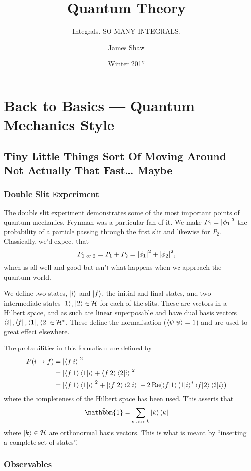 \documentclass[]{scrreprt}
\title{Quantum Theory}
\subtitle{Integrals. SO MANY INTEGRALS.}
\author{James Shaw}
\date{Winter 2017}
\begin{document}


\tableofcontents %

\part{Back to Basics --- Quantum Mechanics Style}
\chapter{Tiny Little Things Sort Of Moving Around Not Actually That Fast\ldots{} Maybe}
\section{Double Slit Experiment}

The double slit experiment demonstrates some of the most important points of quantum mechanics.
Feynman was a particular fan of it. We make $P_1 = \abs{\phi_1}^2$ the probability of a particle passing through the first slit and likewise for $P_2$.
Classically, we'd expect that $$P_{1\text{ or }2} = P_1 + P_2 = \abs{\phi_1}^2 + \abs{\phi_2}^2,$$ which is all well and good but isn't what happens when we approach the quantum world.

We define two states, $\ket{i}$ and $\ket{f}$, the initial and final states, and two intermediate states $\ket{1}, \ket{2} \in \mathcal{H}$ for each of the slits.
These are vectors in a Hilbert space, and as such are linear superposable and have dual basis vectors $\bra{i}, \bra{f}, \bra{1}, \bra{2} \in \mathcal{H}^\ast$.
These define the normalisation ($\braket{\psi} = 1$) and are used to great effect elsewhere.

The probabilities in this formalism are defined by
\begin{align*}
  P(i \to f) &= \abs{\bra{f}\ket{i}}^2\\
   &= \abs{\bra{f}\ket{1}\bra{1}\ket{i} + \bra{f}\ket{2}\bra{2}\ket{i}}^2\\
  &= \abs{\bra{f}\ket{1}\bra{1}\ket{i}}^2 + \abs{\bra{f}\ket{2}\bra{2}\ket{i}} + 2 \Re(\bra{f}\ket{1}\bra{1}\ket{i}^\ast \bra{f}\ket{2}\bra{2}\ket{i})
\end{align*}
where the completeness of the Hilbert space has been used.
This asserts that \[ \hat{\mathbbm{1}} = \sum_{\text{states}\, k} \ket{k}\bra{k}\] where \( \ket{k}\in\mathcal{H} \) are orthonormal basis vectors.
This is what is meant by ``inserting a complete set of states''.

\section{Observables}
\end{document}
